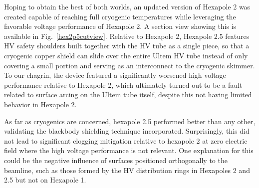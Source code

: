 Hoping to obtain the best of both worlds, an updated version of Hexapole 2 was created capable of reaching full cryogenic temperatures while leveraging the favorable voltage performance of Hexapole 2.
A section view showing this is available in Fig.~\ref{hex2p5cutview}.
Relative to Hexapole 2, Hexapole 2.5 features HV safety shoulders built together with the HV tube as a single piece, so that a cryogenic copper shield can slide over the entire Ultem HV tube instead of only covering a small portion and serving as an interconnect to the cryogenic skimmer.
To our chagrin, the device featured a significantly worsened high voltage performance relative to Hexapole 2, which ultimately turned out to be a fault related to surface arcing on the Ultem tube itself, despite this not having limited behavior in Hexapole 2.


As far as cryogenics are concerned, hexapole 2.5 performed better than any other, validating the blackbody shielding technique incorporated.
Surprisingly, this did not lead to significant clogging mitigation relative to hexapole 2 at zero electric field where the high voltage performance is not relevant.
One explanation for this could be the negative influence of surfaces positioned orthogonally to the beamline, such as those formed by the HV distribution rings in Hexapoles 2 and 2.5 but not on Hexapole 1.


